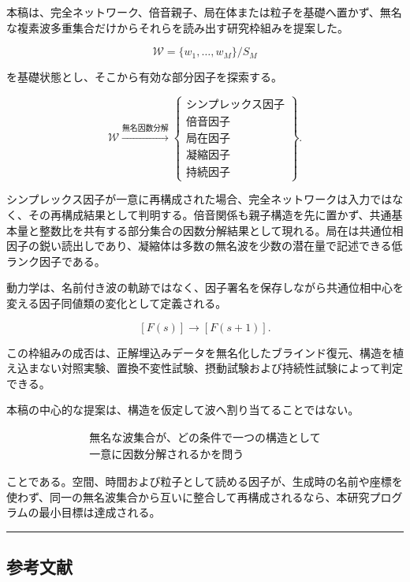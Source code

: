 \documentclass[
  a4paper,
]{ltjsarticle}
\begin{document}
本稿は、完全ネットワーク、倍音親子、局在体または粒子を基礎へ置かず、無名な複素波多重集合だけからそれらを読み出す研究枠組みを提案した。

\[
\mathcal W
=
\{w_1,\ldots,w_M\}/S_M
\]

を基礎状態とし、そこから有効な部分因子を探索する。

\[
\mathcal W
\xrightarrow{\text{無名因数分解}}
\left\{
\begin{array}{l}
\text{シンプレックス因子}\\
\text{倍音因子}\\
\text{局在因子}\\
\text{凝縮因子}\\
\text{持続因子}
\end{array}
\right\}.
\]

シンプレックス因子が一意に再構成された場合、完全ネットワークは入力ではなく、その再構成結果として判明する。倍音関係も親子構造を先に置かず、共通基本量と整数比を共有する部分集合の因数分解結果として現れる。局在は共通位相因子の鋭い読出しであり、凝縮体は多数の無名波を少数の潜在量で記述できる低ランク因子である。

動力学は、名前付き波の軌跡ではなく、因子署名を保存しながら共通位相中心を変える因子同値類の変化として定義される。

\[
[F(s)]
\longrightarrow
[F(s+1)].
\]

この枠組みの成否は、正解埋込みデータを無名化したブラインド復元、構造を植え込まない対照実験、置換不変性試験、摂動試験および持続性試験によって判定できる。

本稿の中心的な提案は、構造を仮定して波へ割り当てることではない。

\[
\boxed{
\begin{array}{l}
\text{無名な波集合が、どの条件で一つの構造として}\\
\text{一意に因数分解されるかを問う}
\end{array}
}
\]

ことである。空間、時間および粒子として読める因子が、生成時の名前や座標を使わず、同一の無名波集合から互いに整合して再構成されるなら、本研究プログラムの最小目標は達成される。

\begin{center}\rule{0.5\linewidth}{0.5pt}\end{center}

\subsection{参考文献}\label{ux53c2ux8003ux6587ux732e}
\end{document}
